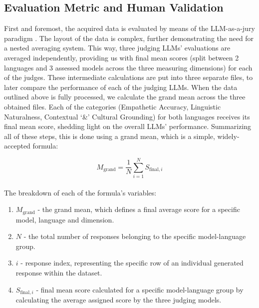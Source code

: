 \documentclass[10pt, twocolumn]{article}
\begin{document}
\subsection{Evaluation Metric and Human Validation}
First and foremost, the acquired data is evaluated by means of the LLM-as-a-jury paradigm  \cite{soumik2026judgingjudgessystematicevaluation, zheng2023judgingllmasajudgemtbenchchatbot, li2025generationjudgmentopportunitieschallenges}. The layout of the data is complex, further demonstrating the need for a nested averaging system. This way, three judging LLMs' evaluations are averaged independently, providing us with final mean scores (split between 2 languages and 3 assessed models across the three measuring dimensions) for each of the judges. These intermediate calculations are put into three separate files, to later compare the performance of each of the judging LLMs. When the data outlined above is fully processed, we calculate the grand mean across the three obtained files. Each of the categories (Empathetic Accuracy, Linguistic Naturalness, Contextual `\&' Cultural Grounding) for both languages receives its final mean score, shedding light on the overall LLMs' performance. Summarizing all of these steps, this is done using a grand mean, which is a simple, widely-accepted formula:

\begin{equation*}\label{eq:grand_mean}M_{\text{grand}} = \frac{1}{N} \sum_{i=1}^{N} S_{\text{final}, i}\end{equation*} \\

The breakdown of each of the formula's variables:

\begin{enumerate}
    \item $M_{\text{grand}}$ - the grand mean, which defines a final average score for a specific model, language and dimension.
    \item $N$ - the total number of responses belonging to the specific model-language group.
    \item $i$ - response index, representing the specific row of an individual generated response within the dataset.
    \item $S_{\text{final}, i}$ - final mean score calculated for a specific model-language group by calculating the average assigned score by the three judging models.
\end{enumerate}
\end{document}
